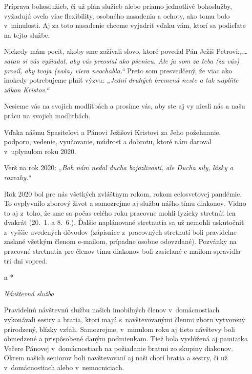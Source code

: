 Príprava bohoslužieb, či už plán služieb alebo priamo jednotlivé bohoslužby, vyžadujú oveľa viac flexibility, osobného nasadenia a ochoty, ako tomu bolo v~minulosti. Aj za toto nasadenie chceme vyjadriť vďaku vám, ktorí sa podieľate na tejto službe.

Niekedy mám pocit, akoby sme zažívali slovo, ktoré povedal Pán Ježiš Petrovi:{\it „… satan si vás vyžiadal, aby vás preosial ako pšenicu. Ale ja som za teba (za vás) prosil, aby tvoja (vaša)  viera neochabla.“} Preto som presvedčený, že viac ako inokedy potrebujeme plniť výzvu: {\it„Jedni druhých bremená neste a tak naplňte zákon Kristov.“}

Nesieme vás na svojich modlitbách a prosíme vás, aby ste aj vy niesli nás a našu prácu na svojich modlitbách.

Vďaka nášmu Spasiteľovi a Pánovi Ježišovi Kristovi za Jeho požehnanie, podporu, vedenie, vyučovanie, múdrosť a dobrotu, ktoré nám daroval v~uplynulom roku 2020.



Verš na rok 2020: {\it „Boh nám nedal ducha bojazlivosti, ale Ducha sily, lásky a rozvahy.“}


Rok 2020 bol pre nás všetkých zvláštnym rokom, rokom celosvetovej pandémie. To ovplyvnilo zborový život a samozrejme aj službu nášho tímu diakonov. Vidno to aj z~toho, že sme sa počas celého roku pracovne mohli fyzicky stretnúť len dvakrát (20.~1. a 8.~6.). Ďalšie naplánované stretnutia sa už nemohli uskutočniť z~vyššie uvedených dôvodov (zápisnice z~pracovných stretnutí boli pravidelne zaslané všetkým členom e-mailom, prípadne osobne odovzdané). Pozvánky na pracovné stretnutia pre členov tímu diakonov boli zasielané e-mailom spravidla tri dni vopred.

\def\aktivita#1{{\it #1\par}\firstnoindent}

\begitems \style n
* \aktivita{Návštevná služba}
Pravidelnú návštevnú službu našich imobilných členov v~domácnostiach vykonávali sestry a bratia, ktorí majú s~navštevovanými členmi zboru vytvorený prirodzený, blízky vzťah. Samozrejme, v~minulom roku aj tieto návštevy boli obmedzené a prispôsobené daným podmienkam. Tiež bola vyslúžená aj pamiatka Večere Pánovej v~domácnostiach na požiadanie bratmi zo skupiny diakonov. Okrem našich seniorov boli navštevovaní aj naši chorí bratia a sestry, či už v~domácnostiach alebo v~nemocniciach.

